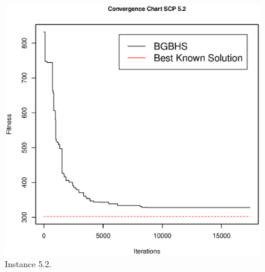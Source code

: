 \begin{figure}[]
\centering
\includegraphics[scale=.45]{Resultados/scp52.eps}
\caption{Instance 5.2.}
\label{fig:Instance.5.2}
\end{figure}

